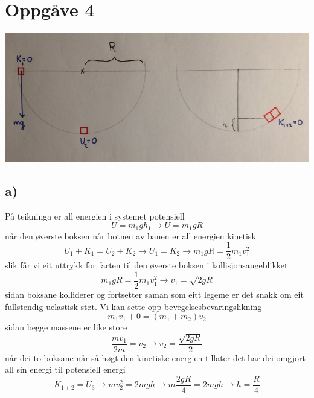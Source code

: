 \documentclass[12pt,a4paper]{article}
\begin{document}
  \section*{Oppgåve 4}
    \begin{center}
      \includegraphics[width=140mm]{04_04}
    \end{center}

    \subsection*{a)}
    På teikninga er all energien i systemet potensiell
    \begin{equation}
      U = m_1gh_1 \rightarrow U = m_1gR
    \end{equation}
    når den øverste boksen når botnen av banen er all energien kinetisk
    \begin{equation}
      U_1 + K_1 = U_2 + K_2 \rightarrow U_1 = K_2 \rightarrow m_1gR = \frac{1}{2}m_1v_1^2
    \end{equation}
    slik får vi eit uttrykk for farten til den øverste boksen i kollisjonsaugeblikket.
    \begin{equation}
      m_1gR = \frac{1}{2}m_1v_1^2 \rightarrow v_1 = \sqrt{2gR}
    \end{equation}
    sidan boksane kolliderer og fortsetter saman som eitt legeme er det snakk om eit
    fullstendig uelastisk støt. Vi kan sette opp bevegelsesbevaringslikning
    \begin{equation}
      m_1v_1 + 0 = (m_1 + m_2)v_2
    \end{equation}
    sidan begge massene er like store
    \begin{equation}
      \frac{mv_1}{2m} = v_2 \rightarrow v_2 = \frac{\sqrt{2gR}}{2}
    \end{equation}
    når dei to boksane når så høgt den kinetiske energien tillater det har dei omgjort all
    sin energi til potensiell energi
    \begin{equation}
      K_{1+2} = U_3 \rightarrow mv_2^2 = 2mgh \rightarrow
      m\frac{2gR}{4} = 2mgh \longrightarrow h = \frac{R}{4}
    \end{equation}
\end{document}

